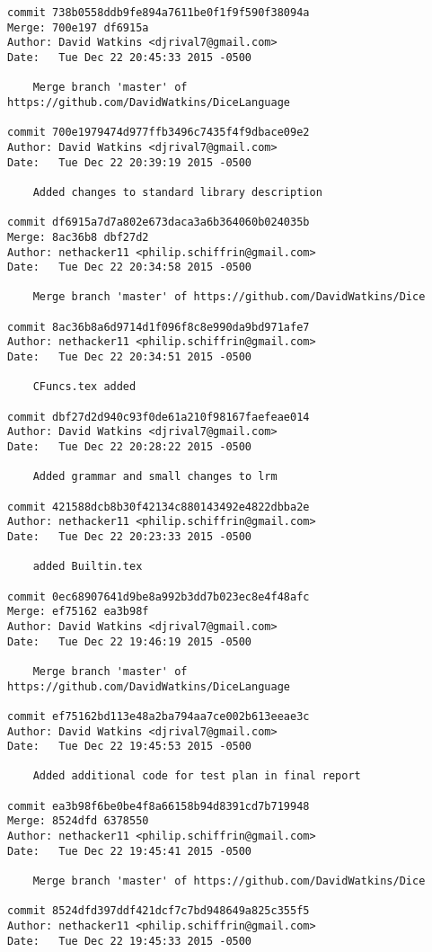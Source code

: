 \begin{verbatim}
commit 738b0558ddb9fe894a7611be0f1f9f590f38094a
Merge: 700e197 df6915a
Author: David Watkins <djrival7@gmail.com>
Date:   Tue Dec 22 20:45:33 2015 -0500

    Merge branch 'master' of https://github.com/DavidWatkins/DiceLanguage

commit 700e1979474d977ffb3496c7435f4f9dbace09e2
Author: David Watkins <djrival7@gmail.com>
Date:   Tue Dec 22 20:39:19 2015 -0500

    Added changes to standard library description

commit df6915a7d7a802e673daca3a6b364060b024035b
Merge: 8ac36b8 dbf27d2
Author: nethacker11 <philip.schiffrin@gmail.com>
Date:   Tue Dec 22 20:34:58 2015 -0500

    Merge branch 'master' of https://github.com/DavidWatkins/Dice

commit 8ac36b8a6d9714d1f096f8c8e990da9bd971afe7
Author: nethacker11 <philip.schiffrin@gmail.com>
Date:   Tue Dec 22 20:34:51 2015 -0500

    CFuncs.tex added

commit dbf27d2d940c93f0de61a210f98167faefeae014
Author: David Watkins <djrival7@gmail.com>
Date:   Tue Dec 22 20:28:22 2015 -0500

    Added grammar and small changes to lrm

commit 421588dcb8b30f42134c880143492e4822dbba2e
Author: nethacker11 <philip.schiffrin@gmail.com>
Date:   Tue Dec 22 20:23:33 2015 -0500

    added Builtin.tex

commit 0ec68907641d9be8a992b3dd7b023ec8e4f48afc
Merge: ef75162 ea3b98f
Author: David Watkins <djrival7@gmail.com>
Date:   Tue Dec 22 19:46:19 2015 -0500

    Merge branch 'master' of https://github.com/DavidWatkins/DiceLanguage

commit ef75162bd113e48a2ba794aa7ce002b613eeae3c
Author: David Watkins <djrival7@gmail.com>
Date:   Tue Dec 22 19:45:53 2015 -0500

    Added additional code for test plan in final report

commit ea3b98f6be0be4f8a66158b94d8391cd7b719948
Merge: 8524dfd 6378550
Author: nethacker11 <philip.schiffrin@gmail.com>
Date:   Tue Dec 22 19:45:41 2015 -0500

    Merge branch 'master' of https://github.com/DavidWatkins/Dice

commit 8524dfd397ddf421dcf7c7bd948649a825c355f5
Author: nethacker11 <philip.schiffrin@gmail.com>
Date:   Tue Dec 22 19:45:33 2015 -0500


\end{verbatim}
